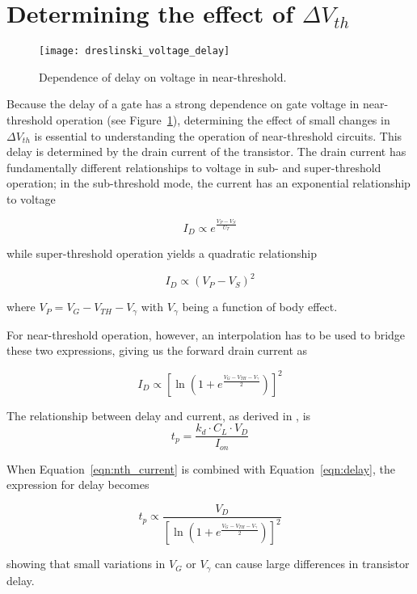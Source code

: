 \section{Determining the effect of $\Delta V_{th}$}
\label{sec:deltavth}

\begin{figure}[thpb]
    \centering
    \texttt{[image: dreslinski\_voltage\_delay]}
    \caption{Dependence of delay on voltage in near-threshold.~\cite{Dreslinski:2010ez}}
    \label{fig:voltage_delay}
\end{figure}
Because the delay of a gate has a strong dependence on gate voltage in near-threshold operation (see Figure~\ref{fig:voltage_delay}), determining the effect of small changes in $\Delta V_{th}$ is essential to understanding the operation of near-threshold circuits.
This delay is determined by the drain current of the transistor.
The drain current has fundamentally different relationships to voltage in sub- and super-threshold operation; in the sub-threshold mode, the current has an exponential relationship to voltage~\cite{Enz:1995vs} 

\begin{equation}
I_D \propto e^\frac{V_P-V_S}{U_T}
\end{equation}

while super-threshold operation yields a quadratic relationship

\begin{equation}
I_D \propto (V_P-V_S)^2
\end{equation}

where $V_P=V_G-V_{TH}-V_\gamma$ with $V_\gamma$ being a function of body effect.

For near-threshold operation, however, an interpolation has to be used to bridge these two expressions\cite{Enz:1995vs}, giving us the forward drain current as

\begin{equation}
\label{eqn:nth_current}
I_D \propto \left[\ln\left(1+e^\frac{V_G-V_{TH}-V_\gamma}{2}\right)\right]^2
\end{equation}

The relationship between delay and current, as derived in \cite{Hanson:2007uu}, is
\begin{equation}
\label{eqn:delay}
t_p = \frac{k_d\cdot C_L\cdot V_D}{I_{on}}
\end{equation}

When Equation~\ref{eqn:nth_current} is combined with Equation~\ref{eqn:delay}, the expression for delay becomes

\begin{equation}
\label{eqn:nth_delay}
t_p\propto\frac{V_D}{\left[\ln\left(1+e^\frac{V_G-V_{TH}-V_\gamma}{2}\right)\right]^2}
\end{equation}
 
 showing that small variations in $V_G$ or $V_\gamma$ can cause large differences in transistor delay.
